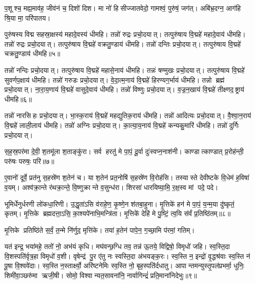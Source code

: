 प॒शूश्च॒ मह्य॒माव॑ह॒ जीव॑नं च॒ दिशो॑ दिश। मा नो॑ हिसीज्जातवेदो॒ गामश्वं॒ पुरु॑षं॒ जग॑त्। अबि॑भ्र॒दग्न॒ आग॑हि श्रि॒या मा॒ परि॑पातय।


 पुरु॑षस्य विद्म सहस्रा॒क्षस्य॑ महादे॒वस्य॑ धीमहि। तन्नो॑ रुद्रः प्रचो॒दयात्। तत्पुरु॑षाय वि॒द्महे॑ महादे॒वाय॑ धीमहि। तन्नो॑ रुद्रः प्रचो॒दयात्। तत्पुरु॑षाय वि॒द्महे॑ वक्रतु॒ण्डाय॑ धीमहि। तन्नो॑ दन्तिः प्रचो॒दयात्। तत्पुरु॑षाय वि॒द्महे॑ चक्रतु॒ण्डाय॑ धीमहि॥५॥

 तन्नो॑ नन्दिः प्रचो॒दयात्। तत्पुरु॑षाय वि॒द्महे॑ महासे॒नाय॑ धीमहि। तन्नः॑ षण्मुखः प्रचो॒दयात्। तत्पुरु॑षाय वि॒द्महे॑ सुवर्णप॒क्षाय॑ धीमहि। तन्नो॑ गरुडः प्रचो॒दयात्। वे॒दा॒त्म॒नाय॑ वि॒द्महे॑ हिरण्यग॒र्भाय॑ धीमहि। तन्नो ब्रह्म॑ प्रचो॒दयात्। ना॒रा॒य॒णाय॑ वि॒द्महे॑ वासुदे॒वाय॑ धीमहि। तन्नो॑ विष्णुः प्रचो॒दयात्। व॒ज्र॒न॒खाय॑ वि॒द्महे॑ तीक्ष्णद॒ष्ट्राय॑ धीमहि॥६॥
 
तन्नो॑ नारसिहः प्रचो॒दयात्। भा॒स्क॒राय॑ वि॒द्महे॑ महद्युतिक॒राय॑ धीमहि। तन्नो॑ आदित्यः प्रचो॒दयात्। वै॒श्वा॒न॒राय॑ वि॒द्महे॑ लाली॒लाय॑ धीमहि। तन्नो॑ अग्निः प्रचो॒दयात्। का॒त्या॒य॒नाय॑ वि॒द्महे॑ कन्यकु॒मारि॑ धीमहि। तन्नो॑ दुर्गिः प्रचो॒दयात्। 

स॒ह॒स्र॒पर॑मा दे॒वी॒ श॒तमू॑ला श॒ताङ्कु॑रा। सर्व हरतु॑ मे पा॒पं॒ दू॒र्वा दुः॑स्वप्न॒नाश॑नी। काण्डात्काण्डात् प्र॒रोह॑न्ती॒ परु॑षः परुषः॒ परि॑॥७॥

ए॒वानो॑ दूर्वे॒ प्रत॑नु स॒हस्रे॑ण श॒तेन॑ च। या श॒तेन॑ प्रत॒नोषि॑ स॒हस्रे॑ण वि॒रोह॑सि। तस्यास्ते देवीष्टके वि॒धेम॑ ह॒विषा॑ व॒यम्। अश्व॑क्रा॒न्ते र॑थक्रा॒न्ते॒ वि॒ष्णुक्रान्ते व॒सुन्ध॑रा। शिरसा॑ धारयिष्या॒मि॒ र॒क्ष॒स्व मां पदे॒ पदे।

 भूमिर्धेनुर्धरणी लो॑कधा॒रिणी। उ॒द्धृता॑ऽसि व॑राहे॒ण॒ कृ॒ष्णे॒न श॑तबा॒हुना। मृ॒त्तिके॑ हन॑ मे पा॒पं॒ य॒न्म॒या दु॑ष्कृतं॒ कृतम्। मृ॒त्तिके ब्रह्मदत्ता॒ऽसि॒ का॒श्यपे॑नाभि॒मन्त्रि॑ता। मृ॒त्तिके॑ देहि॑ मे पु॒ष्टिं॒ त्व॒यि स॑र्वं प्र॒तिष्ठि॑तम्॥८॥
 
 मृ॒त्तिके प्रतिष्ठि॑ते स॒र्वं॒ त॒न्मे नि॑र्णुद॒ मृत्ति॑के। तया॑ ह॒तेन॑ पापे॒न॒ ग॒च्छा॒मि प॑रमां॒ गतिम्।

यत॑ इन्द्र॒ भया॑महे॒ ततो॑ नो॒ अभ॑यं कृधि। मघ॑वन्छ॒ग्धि तव॒ तन्न॑ ऊ॒तये॒ विद्विषो॒ विमृधो॑ जहि। स्व॒स्ति॒दा वि॒शस्पति॑र्वृत्र॒हा विमृधो॑ व॒शी। वृषेन्द्र॑ पु॒र ए॑तु नः स्वस्ति॒दा अ॑भयङ्क॒रः। स्व॒स्ति न॒ इन्द्रो॑ वृ॒द्धश्र॑वाः स्व॒स्ति न॑ पू॒षा वि॒श्ववे॑दाः। स्व॒स्ति न॒स्तार्क्ष्यो॒ अरि॑ष्टनेमिः स्व॒स्ति नो॒ बृह॒स्पति॑र्दधातु। आपान्तमन्युस्तृ॒पल॑प्रभर्मा॒ धुनिः॒ शिमी॑वा॒ञ्छरु॑मा ऋजी॒षी। सोमो॒ विश्वान्यत॒सावना॑नि॒ नार्वागिन्द्रं॑ प्रति॒माना॑निदेभुः॥९॥

